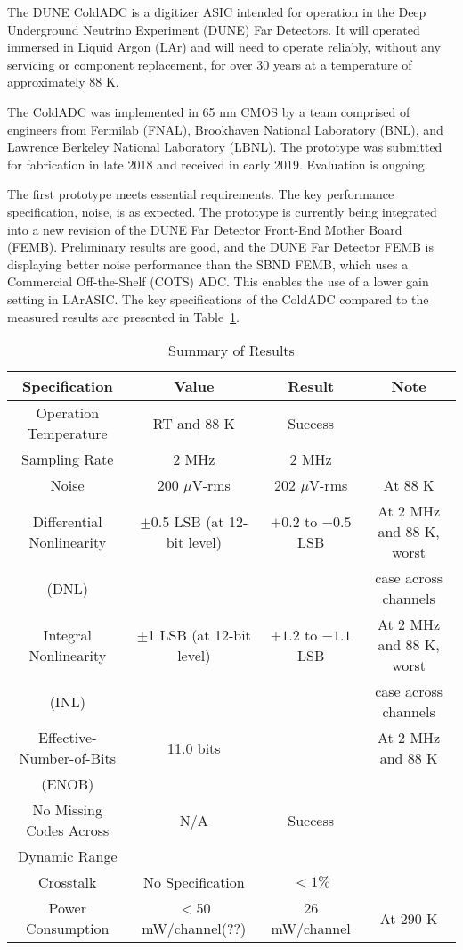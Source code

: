 \label{sec:1}

The DUNE ColdADC is a digitizer ASIC intended for operation in the Deep Underground Neutrino Experiment (DUNE) Far Detectors. It will operated immersed in Liquid Argon (LAr) and will need to operate reliably, without any servicing or component replacement, for over 30 years at a temperature of approximately 88 K. 

The ColdADC was implemented in 65 nm CMOS by a team comprised of engineers from Fermilab (FNAL), Brookhaven National Laboratory (BNL), and Lawrence Berkeley National Laboratory (LBNL). The prototype was submitted for fabrication in late 2018 and received in early 2019. Evaluation is ongoing. 

The first prototype meets essential requirements. The key performance specification, noise, is as expected. The prototype is currently being integrated into a new revision of the DUNE Far Detector Front-End Mother Board (FEMB). Preliminary results are good, and the DUNE Far Detector FEMB is displaying better noise performance than the SBND FEMB, which uses a Commercial Off-the-Shelf (COTS) ADC. This enables the use of a lower gain setting in LArASIC. The key specifications of the ColdADC compared to the measured results are presented in Table~\ref{tab:coldadc_specs}.
\begin{table}[h]
\centering
\begin{tabular}{|c|c|c|c|}
\hline
\textbf{ Specification } & \textbf{Value} & \textbf{Result} & \textbf{Note}  \\ \hline \hline
Operation Temperature &  RT and 88 K & Success & \\ \hline
Sampling Rate & 2 MHz & 2 MHz & \\ \hline
Noise & 200 $\mu$V-rms & 202 $\mu$V-rms & At 88 K \\ \hline
Differential Nonlinearity & $\pm$0.5 LSB (at 12-bit level) & $+0.2$ to $-0.5$ LSB & At 2 MHz and 88 K, worst \\
(DNL) & & & case across channels \\ \hline
Integral Nonlinearity & $\pm$1 LSB (at 12-bit level) & $+1.2$ to $-1.1$ LSB & At 2 MHz and 88 K, worst \\
(INL) & & & case across channels \\ \hline
Effective-Number-of-Bits & 11.0 bits & & At 2 MHz and 88 K \\ 
(ENOB) & & & \\ \hline
No Missing Codes Across & N/A & Success & \\ 
Dynamic Range & & & \\ \hline
Crosstalk  & No Specification & $<1\%$ & \\ \hline
Power Consumption & $<$50 mW/channel(??) & 26 mW/channel & At 290 K \\ \hline
\end{tabular}
\caption{Summary of Results}
\label{tab:coldadc_specs}
\end{table}

